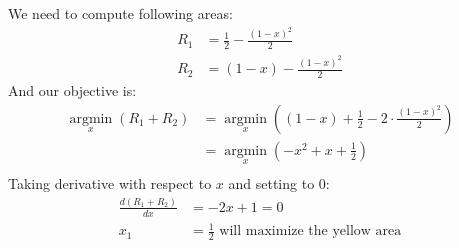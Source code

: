 \documentclass{article}
\begin{document}
\begin{enumerate}
    We need to compute following areas:\\
    \begin{equation}
        \begin{split}
            R_1 &= \frac{1}{2} - \frac{(1-x)^2}{2} \\
            R_2 &= (1-x) - \frac{(1-x)^2}{2}
        \end{split}
    \end{equation}
    And our objective is:
    \begin{equation}
        \begin{split}
            \operatorname*{argmin}_x (R_1 + R_2) &= \operatorname*{argmin}_x \left((1-x) + \frac{1}{2} - 2 \cdot \frac{(1-x)^2}{2}\right)\\
            &= \operatorname*{argmin}_x (-x^2 + x + \frac{1}{2})\\
        \end{split}
    \end{equation}
    Taking derivative with respect to $x$ and setting to 0:\\
    \begin{equation}
        \begin{split}
            \frac{d(R_1 + R_2)}{dx} &= -2x+1 = 0\\
            x_1 &= \frac{1}{2} \text{ will maximize the yellow area}
        \end{split}
    \end{equation}


\end{enumerate}
\end{document}
